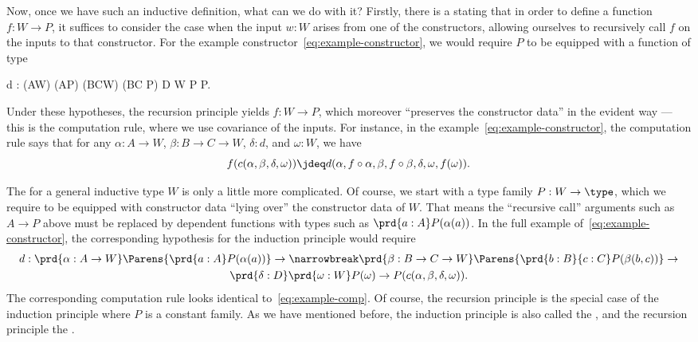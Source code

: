 %
Now, once we have such an inductive definition, what can we do with it?
Firstly, there is a  stating that in order to define a function $f:W\to P$, it suffices to consider the case when the input $w:W$ arises from one of the constructors, allowing ourselves to recursively call $f$ on the inputs to that constructor.
For the example constructor~\eqref{eq:example-constructor}, we would require $P$ to be equipped with a function of type
\begin{narrowmultline}\label{eq:example-rechyp}
  d : (A\to W) \to (A\to P) \to (B\to C\to W) \to
  \narrowbreak
  (B\to C \to P) \to D \to W \to P \to P.
\end{narrowmultline}
Under these hypotheses, the recursion principle yields $f:W\to P$, which moreover ``preserves the constructor data'' in the evident way --- this is the computation rule, where we use covariance of the inputs.
%
For instance, in the example~\eqref{eq:example-constructor}, the computation rule says that for any $\alpha:A\to W$, $\beta:B\to C\to W$, $\delta:d$, and $\omega:W$, we have
\begin{equation}
  f(c(\alpha,\beta,\delta,\omega)) \jdeq d(\alpha,f\circ \alpha,\beta, f\circ \beta, \delta, \omega,f(\omega)).\label{eq:example-comp}
\end{equation}

%
The  for a general inductive type $W$ is only a little more complicated.
Of course, we start with a type family $P:W\to\type$, which we require to be equipped with constructor data ``lying over'' the constructor data of $W$.
That means the ``recursive call'' arguments such as $A\to P$ above must be replaced by dependent functions with types such as $\prd{a:A} P(\alpha(a))$.
In the full example of~\eqref{eq:example-constructor}, the corresponding hypothesis for the induction principle would require
\begin{multline}\label{eq:example-indhyp}
d : \prd{\alpha:A\to W}\Parens{\prd{a:A} P(\alpha(a))} \to \narrowbreak
\prd{\beta:B\to C\to W} \Parens{\prd{b:B}{c:C} P(\beta(b,c))} \to\\
\prd{\delta:D}
\prd{\omega:W} P(\omega) \to
P(c(\alpha,\beta,\delta,\omega)).
\end{multline}
The corresponding computation rule looks identical to~\eqref{eq:example-comp}.
Of course, the recursion principle is the special case of the induction principle where $P$ is a constant family.
As we have mentioned before, the induction principle is also called the , and the recursion principle the .

